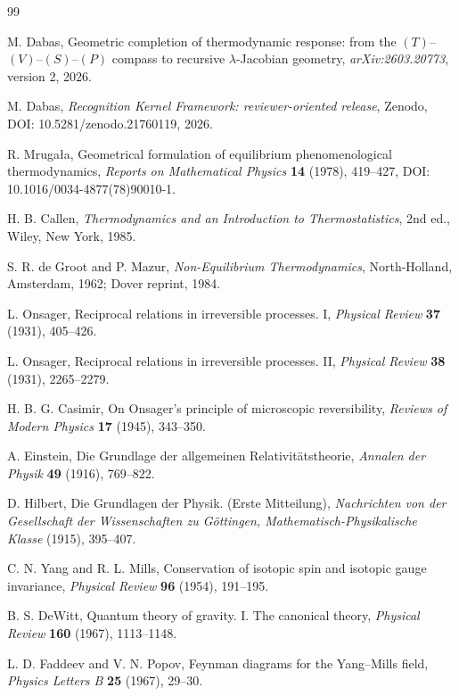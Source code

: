 \begin{thebibliography}{99}

M. Dabas,
Geometric completion of thermodynamic response: from the $(T)$--$(V)$--$(S)$--$(P)$ compass to recursive $\lambda$-Jacobian geometry,
\emph{arXiv:2603.20773}, version 2, 2026.

M. Dabas,
\emph{Recognition Kernel Framework: reviewer-oriented release},
Zenodo, DOI: 10.5281/zenodo.21760119, 2026.

R. Mruga{\l}a,
Geometrical formulation of equilibrium phenomenological thermodynamics,
\emph{Reports on Mathematical Physics} \textbf{14} (1978), 419--427,
DOI: 10.1016/0034-4877(78)90010-1.

H. B. Callen,
\emph{Thermodynamics and an Introduction to Thermostatistics}, 2nd ed.,
Wiley, New York, 1985.

S. R. de Groot and P. Mazur,
\emph{Non-Equilibrium Thermodynamics},
North-Holland, Amsterdam, 1962; Dover reprint, 1984.

L. Onsager,
Reciprocal relations in irreversible processes. I,
\emph{Physical Review} \textbf{37} (1931), 405--426.

L. Onsager,
Reciprocal relations in irreversible processes. II,
\emph{Physical Review} \textbf{38} (1931), 2265--2279.

H. B. G. Casimir,
On Onsager's principle of microscopic reversibility,
\emph{Reviews of Modern Physics} \textbf{17} (1945), 343--350.

A. Einstein,
Die Grundlage der allgemeinen Relativit\"atstheorie,
\emph{Annalen der Physik} \textbf{49} (1916), 769--822.

D. Hilbert,
Die Grundlagen der Physik. (Erste Mitteilung),
\emph{Nachrichten von der Gesellschaft der Wissenschaften zu G\"ottingen, Mathematisch-Physikalische Klasse} (1915), 395--407.

C. N. Yang and R. L. Mills,
Conservation of isotopic spin and isotopic gauge invariance,
\emph{Physical Review} \textbf{96} (1954), 191--195.

B. S. DeWitt,
Quantum theory of gravity. I. The canonical theory,
\emph{Physical Review} \textbf{160} (1967), 1113--1148.

L. D. Faddeev and V. N. Popov,
Feynman diagrams for the Yang--Mills field,
\emph{Physics Letters B} \textbf{25} (1967), 29--30.


\end{thebibliography}
